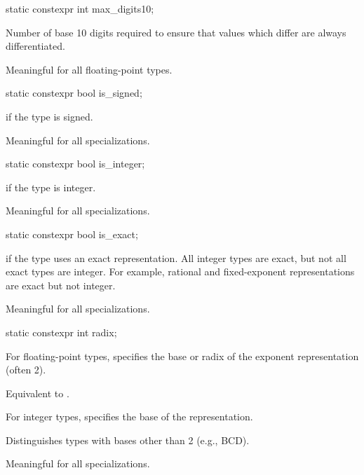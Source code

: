 %
\begin{itemdecl}
static constexpr int max_digits10;
\end{itemdecl}

\begin{itemdescr}
\pnum
Number of base 10 digits required to ensure that values which
differ are always differentiated.

\pnum
Meaningful for all floating-point types.
\end{itemdescr}

%
\begin{itemdecl}
static constexpr bool is_signed;
\end{itemdecl}

\begin{itemdescr}
\pnum
{} if the type is signed.

\pnum
Meaningful for all specializations.
\end{itemdescr}

%
\begin{itemdecl}
static constexpr bool is_integer;
\end{itemdecl}

\begin{itemdescr}
\pnum
{} if the type is integer.

\pnum
Meaningful for all specializations.
\end{itemdescr}

%
\begin{itemdecl}
static constexpr bool is_exact;
\end{itemdecl}

\begin{itemdescr}
\pnum
{} if the type uses an exact representation.
All integer types are exact, but not all exact types are integer.
For example, rational and fixed-exponent representations are exact but not integer.

\pnum
Meaningful for all specializations.
\end{itemdescr}

%
\begin{itemdecl}
static constexpr int radix;
\end{itemdecl}

\begin{itemdescr}
\pnum
For floating-point types, specifies the base or radix of the exponent representation
(often 2).
\begin{footnote}
Equivalent to .
\end{footnote}

\pnum
For integer types, specifies the base of the
representation.
\begin{footnote}
Distinguishes types with bases other than 2 (e.g., BCD).
\end{footnote}

\pnum
Meaningful for all specializations.
\end{itemdescr}

